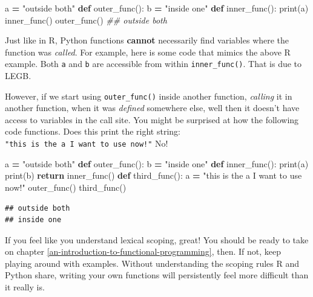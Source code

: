 \documentclass[
  12pt,
  krantz2]{krantz}
\makeatletter
\newenvironment{Shaded}{\begin{snugshade}}{\end{snugshade}}
\newcommand{\BuiltInTok}[1]{#1}
\newcommand{\CommentTok}[1]{\textcolor[rgb]{0.37,0.37,0.37}{\textit{#1}}}
\newcommand{\ControlFlowTok}[1]{\textcolor[rgb]{0.27,0.27,0.27}{\textbf{#1}}}
\newcommand{\KeywordTok}[1]{\textcolor[rgb]{0.27,0.27,0.27}{\textbf{#1}}}
\newcommand{\NormalTok}[1]{#1}
\newcommand{\OperatorTok}[1]{\textcolor[rgb]{0.43,0.43,0.43}{\textbf{#1}}}
\newcommand{\StringTok}[1]{\textcolor[rgb]{0.5,0.5,0.5}{#1}}
\newenvironment{kframe}{%
\medskip{}
\setlength{\fboxsep}{.8em}
 \def\at@end@of@kframe{}%
 \ifinner\ifhmode%
  \def\at@end@of@kframe{\end{minipage}}%
  \begin{minipage}{\columnwidth}%
 \fi\fi%
 \def\FrameCommand##1{\hskip\@totalleftmargin \hskip-\fboxsep
 \colorbox{shadecolor}{##1}\hskip-\fboxsep
     \hskip-\linewidth \hskip-\@totalleftmargin \hskip\columnwidth}%
 \MakeFramed {\advance\hsize-\width
   \@totalleftmargin\z@ \linewidth\hsize
   \@setminipage}}%
 {\par\unskip\endMakeFramed%
 \at@end@of@kframe}
\renewenvironment{Shaded}{\begin{kframe}}{\end{kframe}}
\makeatother
\begin{document}
\begin{Shaded}
\begin{Highlighting}[]
\NormalTok{a }\OperatorTok{=} \StringTok{"outside both"}
\KeywordTok{def}\NormalTok{ outer\_func():}
\NormalTok{  b }\OperatorTok{=} \StringTok{"inside one"}
  \KeywordTok{def}\NormalTok{ inner\_func():}
    \BuiltInTok{print}\NormalTok{(a) }
\NormalTok{  inner\_func()}
\NormalTok{outer\_func()}
\CommentTok{\#\# outside both}
\end{Highlighting}
\end{Shaded}

Just like in R, Python functions \textbf{cannot} necessarily find variables where the function was \emph{called}. For example, here is some code that mimics the above R example. Both \texttt{a} and \texttt{b} are accessible from within \texttt{inner\_func()}. That is due to LEGB.

However, if we start using \texttt{outer\_func()} inside another function, \emph{calling} it in another function, when it was \emph{defined} somewhere else, well then it doesn't have access to variables in the call site. You might be surprised at how the following code functions. Does this print the right string: \texttt{"this\ is\ the\ a\ I\ want\ to\ use\ now!"} No!

\begin{Shaded}
\begin{Highlighting}[]
\NormalTok{a }\OperatorTok{=} \StringTok{"outside both"}
\KeywordTok{def}\NormalTok{ outer\_func():}
\NormalTok{  b }\OperatorTok{=} \StringTok{"inside one"}
  \KeywordTok{def}\NormalTok{ inner\_func():}
    \BuiltInTok{print}\NormalTok{(a) }
    \BuiltInTok{print}\NormalTok{(b)}
  \ControlFlowTok{return}\NormalTok{ inner\_func() }
\KeywordTok{def}\NormalTok{ third\_func():}
\NormalTok{  a }\OperatorTok{=} \StringTok{"this is the a I want to use now!"}
\NormalTok{  outer\_func()}
\NormalTok{third\_func() }
\end{Highlighting}
\end{Shaded}

\begin{verbatim}
## outside both
## inside one
\end{verbatim}

If you feel like you understand lexical scoping, great! You should be ready to take on chapter \ref{an-introduction-to-functional-programming}, then. If not, keep playing around with examples. Without understanding the scoping rules R and Python share, writing your own functions will persistently feel more difficult than it really is.
\end{document}
